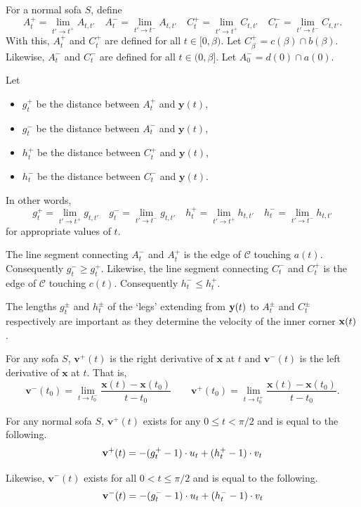\begin{definition}
\label{def:cont-leg-len}
For a normal sofa $S$, define 
$$
A^+_{t}= \lim_{t' \rightarrow t^+} A_{t, t'} \quad
A^-_{t}= \lim_{t' \rightarrow t^-} A_{t, t'} \quad
C^+_{t}= \lim_{t' \rightarrow t^+} C_{t, t'} \quad
C^-_{t}= \lim_{t' \rightarrow t^-} C_{t, t'}.
$$
With this, $A^+_{t}$ and $C^+_{t}$ are defined for all $t \in [0, \beta)$.
Let $C^+_\beta = c(\beta) \cap b(\beta)$.
Likewise, $A^-_{t}$ and $C^-_{t}$ are defined for all $t \in (0, \beta]$.
Let $A^-_0 = d(0) \cap a(0)$.

Let 
\begin{itemize}
\item $g^+_t$ be the distance between $A^+_t$ and $\mathbf{y}(t)$,
\item $g^-_t$ be the distance between $A^-_t$ and $\mathbf{y}(t)$,
\item $h^+_t$ be the distance between $C^+_t$ and $\mathbf{y}(t)$,
\item $h^-_t$ be the distance between $C^-_t$ and $\mathbf{y}(t)$.
\end{itemize}
In other words, 
$$
g^+_{t}= \lim_{t' \rightarrow t^+} g_{t, t'} \quad
g^-_{t}= \lim_{t' \rightarrow t^-} g_{t, t'} \quad
h^+_{t}= \lim_{t' \rightarrow t^+} h_{t, t'} \quad
h^-_{t}= \lim_{t' \rightarrow t^-} h_{t, t'}
$$
for appropriate values of $t$.
\end{definition}

The line segment connecting $A_{t}^-$ and $A_{t}^+$ is the edge of $\mathcal{C}$ touching $a(t)$. Consequently $g_t^- \geq g_t^+$.
Likewise, the line segment connecting $C_{t}^-$ and $C_{t}^+$ is the edge of $\mathcal{C}$ touching $c(t)$. Consequently $h_t^- \leq h_t^+$.

The lengths $g_t^\pm$ and $h_t^\pm$ of the `legs' extending from $\mathbf{y}(t)$ to $A_t^\pm$ and $C_t^\pm$ respectively are important as they determine the velocity of the inner corner $\mathbf{x}(t)$.

\begin{definition}
For any sofa $S$, $\mathbf{v}^+ (t)$ is the right derivative of $\mathbf{x}$ at $t$ and $\mathbf{v}^- (t)$ is the left derivative of $\mathbf{x}$ at $t$. That is,
$$
\mathbf{v}^{-} (t_0) = \lim_{t \rightarrow t_0^-} \frac{\mathbf{x}(t) - \mathbf{x}(t_0)}{t - t_0} \qquad
\mathbf{v}^{+} (t_0) = \lim_{t \rightarrow t_0^+} \frac{\mathbf{x}(t) - \mathbf{x}(t_0)}{t - t_0}.
$$
\end{definition}

\begin{lemma}
\label{lem:leg}
For any normal sofa $S$, $\mathbf{v}^+ (t)$ exists for any $0 \leq t < \pi / 2$ and is equal to the following. 
\begin{align*}
	\mathbf{v}^+(t) = -(g_t^+ - 1) \cdot u_t + (h^+_t - 1) \cdot v_t
\end{align*}

Likewise, $\mathbf{v}^- (t)$ exists for all $0 < t \leq \pi / 2$ and is equal to the following.
\begin{equation*}
	\mathbf{v}^-(t) = -(g^-_t - 1) \cdot u_t + (h^-_t - 1) \cdot v_t
\end{equation*}
\end{lemma}

